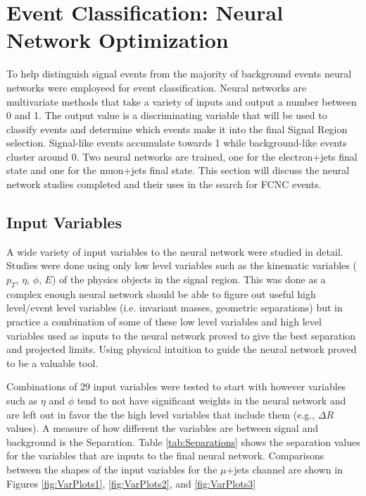



\section{Event Classification: Neural Network Optimization}
\label{sec:NN} 
To help distinguish signal events from the majority of background events neural networks were employeed for event classification.  Neural networks are multivariate methods that take a variety of inputs and output a number between 0 and 1.  The output value is a discriminating variable that will be used to classify events and determine which events make it into the final Signal Region selection.  Signal-like events accumulate towards 1 while background-like events cluster around 0.  Two neural networks are trained, one for the electron+jets final state and one for the muon+jets final state.  This section will discuss the neural network studies completed and their uses in the search for FCNC events.  

\subsection{Input Variables}
A wide variety of input variables to the neural network were studied in detail.  Studies were done using only low level variables such as the kinematic variables  ($p_T$, $\eta$, $\phi$, $E$)  of the physics objects in the signal region.  This was done as a complex enough neural network should be able to figure out useful high level/event level variables (i.e. invariant masses, geometric separations) but in practice a combination of some of these low level variables and high level variables used as inputs to the neural network proved to give the best separation and projected limits.  Using physical intuition to guide the neural network proved to be a valuable tool.

Combinations of 29 input variables were tested to start with however variables such as $\eta$ and $\phi$ tend to not have significant weights in the neural network and are left out in favor the the high level variables that include them (e.g., $\Delta R$ values).  A measure of how different the variables are between signal and background is the Separation.  Table \ref{tab:Separations} shows the separation values for the variables that are inputs to the final neural network.  Comparisons between the shapes of the input variables for the $\mu$+jets channel are shown in Figures \ref{fig:VarPlots1}, \ref{fig:VarPlots2}, and \ref{fig:VarPlots3}

